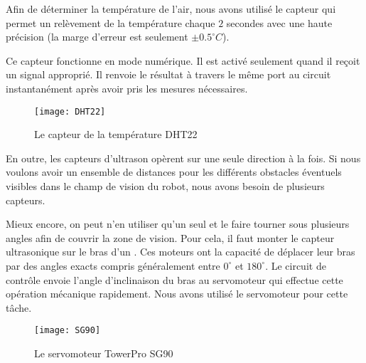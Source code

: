 Afin de déterminer la température de l'air, nous avons utilisé le capteur
 qui permet un relèvement de la température chaque $2$
secondes avec une haute précision (la marge d'erreur est seulement $\pm 0.5 ^\circ C$).

Ce capteur fonctionne en mode numérique. Il est activé seulement quand il reçoit
un signal approprié. Il renvoie le résultat à travers le même port au circuit
instantanément après avoir pris les mesures nécessaires.

\begin{figure}[h]
\begin{center}
\texttt{[image: DHT22]}
\caption{Le capteur de la température DHT22}{}
\end{center}
\end{figure}

En outre, les capteurs d'ultrason opèrent sur une seule direction à la fois. Si
nous voulons avoir un ensemble de distances pour les différents obstacles éventuels
visibles dans le champ de vision du robot, nous avons besoin de plusieurs capteurs.

Mieux encore, on peut n'en utiliser qu'un seul et le faire tourner sous plusieurs
angles afin de couvrir la zone de vision.
Pour cela, il faut monter le capteur ultrasonique sur le bras d'un .
Ces moteurs ont la capacité de déplacer leur bras par des angles exacts compris
généralement entre $0^\circ$ et $180^\circ$. Le circuit de contrôle envoie l'angle
d'inclinaison du bras au servomoteur qui effectue cette opération mécanique rapidement.
Nous avons utilisé le servomoteur  pour cette tâche.

\begin{figure}[h]
\begin{center}
\texttt{[image: SG90]}
\caption{Le servomoteur TowerPro SG90}{}
\end{center}
\end{figure}
